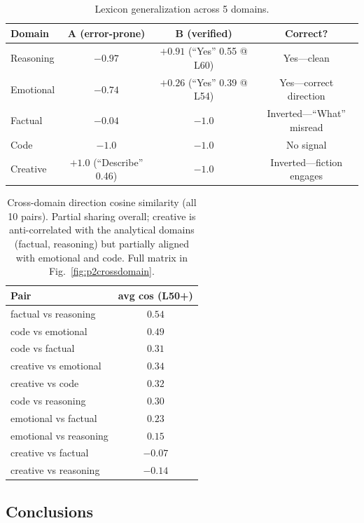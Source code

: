 \documentclass[11pt,a4paper]{article}
\begin{document}
\begin{table}[h]
\centering
\small
\begin{tabular}{lccc}
\toprule
\textbf{Domain} & \textbf{A (error-prone)} & \textbf{B (verified)} & \textbf{Correct?} \\
\midrule
Reasoning & $-0.97$ & $+0.91$ (``Yes'' 0.55 @ L60) & Yes---clean \\
Emotional & $-0.74$ & $+0.26$ (``Yes'' 0.39 @ L54) & Yes---correct direction \\
Factual & $-0.04$ & $-1.0$ & Inverted---``What'' misread \\
Code & $-1.0$ & $-1.0$ & No signal \\
Creative & $+1.0$ (``Describe'' 0.46) & $-1.0$ & Inverted---fiction engages \\
\bottomrule
\end{tabular}
\caption{Lexicon generalization across 5 domains.}
\end{table}

\begin{table}[h]
\centering
\small
\begin{tabular}{lc}
\toprule
\textbf{Pair} & \textbf{avg cos (L50+)} \\
\midrule
factual vs reasoning & $0.54$ \\
code vs emotional & $0.49$ \\
code vs factual & $0.31$ \\
creative vs emotional & $0.34$ \\
creative vs code & $0.32$ \\
code vs reasoning & $0.30$ \\
emotional vs factual & $0.23$ \\
emotional vs reasoning & $0.15$ \\
creative vs factual & $-0.07$ \\
creative vs reasoning & $-0.14$ \\
\bottomrule
\end{tabular}
\caption{Cross-domain direction cosine similarity (all 10 pairs). Partial sharing overall; creative is anti-correlated with the analytical domains (factual, reasoning) but partially aligned with emotional and code. Full matrix in Fig.~\ref{fig:p2crossdomain}.}
\label{tab:crossdomain}
\end{table}

\subsection{Conclusions}
\end{document}
